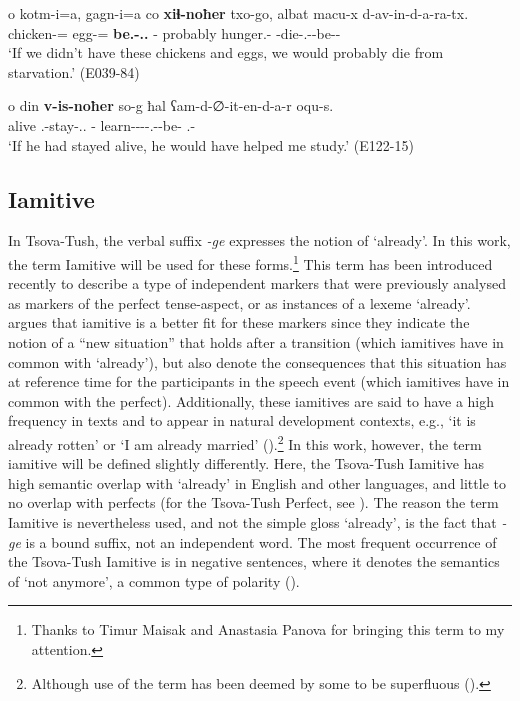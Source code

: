 \begin{exe}
	\ex\label{verbflex-ex17}
	\begin{xlist}
		
		\ex\label{verbflex-ex17a}
		\gll  o kotm-i=a, gagn-i=a co \textbf{xiɬ-noħer} txo-go, albat macu-x d-av-in-d-a-ra-tx. \\
		{\Dist} chicken-{\Pl}={\Add} egg-{\Pl}={\Add} {\Neg} \textbf{be.{\Pfv}-{\Nw}.{\Rem}.{\Cond}} {\Fpl}-{\Adess} probably hunger.{\Obl}-{\Cont} {\D}-die-{\Ptcp}.{\Pst}-{\D}-be-{\Imprf}-{\Fpl} \\
		\trans `If we didn't have these chickens and eggs, we would probably die from starvation.'
		\hfill (E039-84)
		
		\ex\label{verbflex-ex17b}
		\gll  o din \textbf{v-is-noħer} so-g ħal ʕam-d-∅-it-en-d-a-r oqu-s. \\
		{\Dist} alive {\M}.{\Sg}-stay-{\Nw}.{\Rem}.{\Cond} {\Fsg}-{\All} {\Pv} learn-{\D}-{\Tr}-{\Caus}-{\Ptcp}.{\Pst}-{\D}-be-{\Imprf} {\Dist}.{\Obl}-{\Erg}\\
		\trans `If he had stayed alive, he would have helped me study.'
		\hfill (E122-15)
		
	\end{xlist}
\end{exe}


\subsection{Iamitive} \label{cont}

In Tsova-Tush, the verbal suffix \textit{-ge} expresses the notion of `already'. In this work, the term Iamitive will be used for these forms.\footnote{Thanks to Timur Maisak and Anastasia Panova for bringing this term to my attention.} This term has been introduced recently to describe a type of independent markers that were previously analysed as markers of the perfect tense-aspect, or as instances of a lexeme `already'. \textcites{olsson2013iam} argues that iamitive is a better fit for these markers since they indicate the notion of a ``new situation'' that holds after a transition (which iamitives have in common with `already'), but also denote the consequences that this situation has at reference time for the participants in the speech event (which iamitives have in common with the perfect). Additionally, these iamitives are said to have a high frequency in texts and to appear in natural development contexts, e.g., `it is already rotten' or `I am already married' (\cites{olsson2013iam,dahlwalchli2016iam}).\footnote{Although use of the term has been deemed by some to be superfluous (\cites[]{krajinovic2019iam}).} In this work, however, the term iamitive will be defined slightly differently. Here, the Tsova-Tush Iamitive has high semantic overlap with `already' in English and other languages, and little to no overlap with perfects (for the Tsova-Tush Perfect, see ). The reason the term Iamitive is nevertheless used, and not the simple gloss `already', is the fact that \textit{-ge} is a bound suffix, not an independent word. The most frequent occurrence of the Tsova-Tush Iamitive is in negative sentences, where it denotes the semantics of `not anymore', a common type of polarity (\cites[]{lobner1989schon,auwera1993already}).

